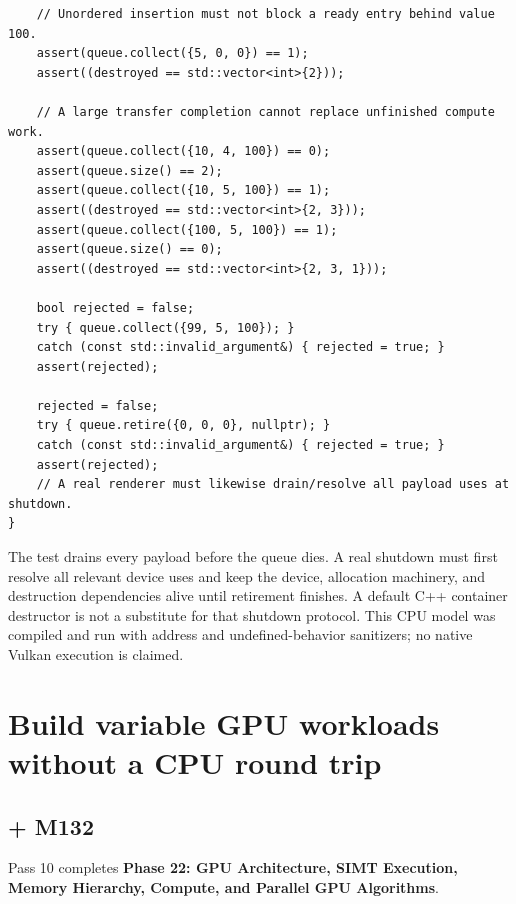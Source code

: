 \begin{verbatim}
    // Unordered insertion must not block a ready entry behind value 100.
    assert(queue.collect({5, 0, 0}) == 1);
    assert((destroyed == std::vector<int>{2}));

    // A large transfer completion cannot replace unfinished compute work.
    assert(queue.collect({10, 4, 100}) == 0);
    assert(queue.size() == 2);
    assert(queue.collect({10, 5, 100}) == 1);
    assert((destroyed == std::vector<int>{2, 3}));
    assert(queue.collect({100, 5, 100}) == 1);
    assert(queue.size() == 0);
    assert((destroyed == std::vector<int>{2, 3, 1}));

    bool rejected = false;
    try { queue.collect({99, 5, 100}); }
    catch (const std::invalid_argument&) { rejected = true; }
    assert(rejected);

    rejected = false;
    try { queue.retire({0, 0, 0}, nullptr); }
    catch (const std::invalid_argument&) { rejected = true; }
    assert(rejected);
    // A real renderer must likewise drain/resolve all payload uses at shutdown.
}
\end{verbatim}

The test drains every payload before the queue dies. A real shutdown must first resolve all relevant device uses and keep the device, allocation machinery, and destruction dependencies alive until retirement finishes. A default C++ container destructor is not a substitute for that shutdown protocol. This CPU model was compiled and run with address and undefined-behavior sanitizers; no native Vulkan execution is claimed.

\section{Build variable GPU workloads without a CPU round trip}\label{01-foundations-i-ch011-build-variable-gpu-workloads-without-a-cpu-round-trip}

\hypertarget{01-foundations-i-ch011-build-variable-gpu-workloads-without-a-cpu-round-trip}{}

\subsection{+ M132}\label{01-foundations-i-ch011-m132}

\hypertarget{01-foundations-i-ch011-m132}{}

Pass 10 completes \textbf{Phase 22: GPU Architecture, SIMT Execution, Memory Hierarchy, Compute, and Parallel GPU Algorithms}.

